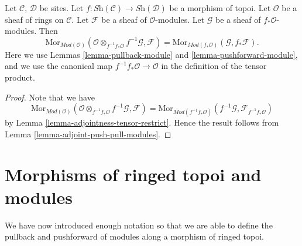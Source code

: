 \begin{lemma}
\label{lemma-adjoint-pull-push-modules}
Let $\mathcal{C}$, $\mathcal{D}$ be sites.
Let $f : \textit{Sh}(\mathcal{C}) \to \textit{Sh}(\mathcal{D})$
be a morphism of topoi.
Let $\mathcal{O}$ be a sheaf of rings on $\mathcal{C}$.
Let $\mathcal{F}$ be a sheaf of $\mathcal{O}$-modules.
Let $\mathcal{G}$ be a sheaf of $f_*\mathcal{O}$-modules.
Then
$$
\text{Mor}_{\textit{Mod}(\mathcal{O})}(
\mathcal{O} \otimes_{f^{-1}f_*\mathcal{O}} f^{-1}\mathcal{G}, \mathcal{F})
=
\text{Mor}_{\textit{Mod}(f_*\mathcal{O})}(\mathcal{G}, f_*\mathcal{F}).
$$
Here we use
Lemmas \ref{lemma-pullback-module}
and \ref{lemma-pushforward-module}, and we use
the canonical map $f^{-1}f_*\mathcal{O} \to \mathcal{O}$
in the definition of the tensor product.
\end{lemma}

\begin{proof}
Note that we have
$$
\text{Mor}_{\textit{Mod}(\mathcal{O})}(
\mathcal{O} \otimes_{f^{-1}f_*\mathcal{O}} f^{-1}\mathcal{G}, \mathcal{F})
=
\text{Mor}_{\textit{Mod}(f^{-1}f_*\mathcal{O})}(
f^{-1}\mathcal{G}, \mathcal{F}_{f^{-1}f_*\mathcal{O}})
$$
by Lemma \ref{lemma-adjointness-tensor-restrict}. Hence the result follows
from Lemma \ref{lemma-adjoint-push-pull-modules}.
\end{proof}






\section{Morphisms of ringed topoi and modules}
\label{section-functoriality-modules}

\noindent
We have now introduced enough notation so that we are able to
define the pullback and pushforward of modules along a morphism
of ringed topoi.

